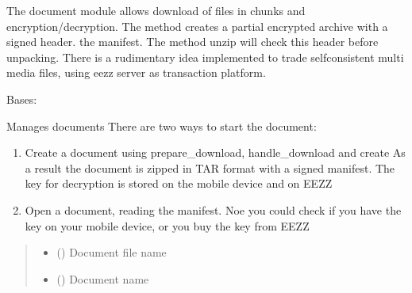 \documentclass[letterpaper,10pt,english]{sphinxmanual}
\begin{document}
\sphinxAtStartPar
The document module allows download of files in chunks and encryption/decryption.
The method  creates a partial encrypted archive with a signed header. the
manifest. The method unzip will check this header before unpacking.
There is a rudimentary idea implemented to trade self\sphinxhyphen{}consistent multi media files, using eezz server as transaction
platform.

\begin{savenotes}\begin{fulllineitems}
\label{\detokenize{eezz:eezz.document.TDocuments}}
\pysigstartsignatures
{}
\pysigstopsignatures
\sphinxAtStartPar
Bases: 

\sphinxAtStartPar
Manages documents
There are two ways to start the document:
\begin{enumerate}
%
\item {} 
\sphinxAtStartPar
Create a document using prepare\_download, handle\_download and create
As a result the document is zipped in TAR format with a signed manifest. The key for decryption is stored on
the mobile device and on EEZZ

\item {} 
\sphinxAtStartPar
Open a document, reading the manifest. Noe you could check if you have the key on your mobile device, or you
buy the key from EEZZ

\end{enumerate}
\begin{quote}\begin{description}
\begin{itemize}
\item {} 
\sphinxAtStartPar
{} () \textendash{} Document file name

\item {} 
\sphinxAtStartPar
{} () \textendash{} Document name


\end{itemize}
\end{description}
\end{quote}
\end{fulllineitems}
\end{savenotes}
\end{document}
